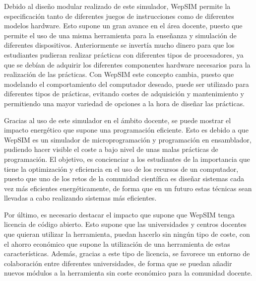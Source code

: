 Debido al diseño modular realizado de este simulador, WepSIM permite la especificación tanto de diferentes juegos de instrucciones como de diferentes modelos hardware. Esto supone un gran avance  en el área docente, puesto que permite el uso de una misma herramienta para la enseñanza y simulación de diferentes dispositivos. Anteriormente se invertía mucho dinero para que los estudiantes pudieran realizar prácticas con diferentes tipos de procesadores, ya que se debían de adquirir los diferentes componentes hardware necesarios para la realización de las prácticas. Con WepSIM este concepto cambia, puesto que modelando el comportamiento del computador deseado, puede ser utilizado para diferentes tipos de prácticas, evitando costes de adquisición y mantenimiento y permitiendo una mayor variedad de opciones a la hora de diseñar las prácticas.

Gracias al uso de este simulador en el ámbito docente, se puede mostrar el impacto energético que supone una programación eficiente. Esto es debido a que WepSIM es un simulador de microprogramación y programación en ensamblador, pudiendo hacer visible el coste a bajo nivel de unas malas prácticas de programación. El objetivo, es concienciar a los estudiantes de la importancia que tiene la optimización y eficiencia en el uso de los recursos de un computador, puesto que uno de los retos de la comunidad científica es diseñar sistemas cada vez más eficientes energéticamente, de forma que en un futuro estas técnicas sean llevadas a cabo realizando sistemas más eficientes.

Por último, es necesario destacar el impacto que supone que WepSIM tenga licencia de código abierto. Esto supone que las universidades y centros docentes que quieran utilizar la herramienta, puedan hacerlo sin ningún tipo de coste, con el ahorro económico que supone la utilización de una herramienta de estas características. Además, gracias a este tipo de licencia, se favorece un entorno de colaboración entre diferentes universidades, de forma que se puedan añadir nuevos módulos a la herramienta sin coste económico para la comunidad docente.

\fi